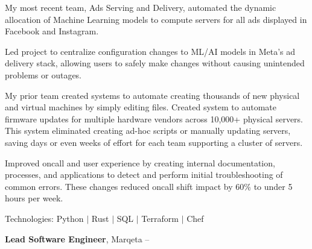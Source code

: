 \documentclass[MMMMyyyy,nonstopmode]{simpleresumecv_stacked}
\newcommand{\tech}[1]{\Gap\textrm{Technologies:} #1}
\begin{document}
\begin{Body}
\begin{Detail}
\Gap

My most recent team, Ads Serving and Delivery, automated the dynamic allocation of Machine Learning models to compute servers for all ads displayed in Facebook and Instagram.

\BulletItem
Led project to centralize configuration changes to ML/AI models in Meta's ad delivery stack, allowing users to safely make changes without causing unintended problems or outages.

\Gap
My prior team created systems to automate creating thousands of new physical and virtual machines by simply editing files. 
\BulletItem
Created system to automate firmware updates for multiple hardware vendors across 10,000+ physical servers. 
This system eliminated creating ad-hoc scripts or manually updating servers, saving days or even weeks of effort for each team supporting a cluster of servers.

\BulletItem
Improved oncall and user experience by creating internal documentation, processes, and applications to detect and perform initial troubleshooting of common errors.
These changes reduced oncall shift impact by 60\% to under 5 hours per week.


\fi 		%

\tech{Python $|$ Rust $|$ SQL $|$ Terraform $|$ Chef}

\end{Detail}

\BigGap

\Entry
\textbf{Lead Software Engineer}, Marqeta
\hfill
 -- 


\end{Body}
\end{document}
